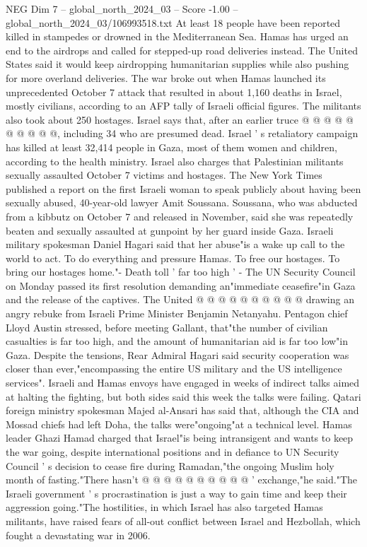 \begin{textsample}{NEG Dim 7 – global\_north\_2024\_03 – Score -1.00 – global\_north\_2024\_03/106993518.txt}
At least 18 people have been reported killed in stampedes or drowned in the Mediterranean Sea.
Hamas has urged an end to the airdrops and called for stepped-up road deliveries instead.
The United States said it would keep airdropping humanitarian supplies while also pushing for more overland deliveries.
The war broke out when Hamas launched its unprecedented October 7 attack that resulted in about 1,160 deaths in Israel, mostly civilians, according to an AFP tally of Israeli official figures.
The militants also took about 250 hostages.
Israel says that, after an earlier truce @ @ @ @ @ @ @ @ @ @, including 34 who are presumed dead.
Israel ' s retaliatory campaign has killed at least 32,414 people in Gaza, most of them women and children, according to the health ministry.
Israel also charges that Palestinian militants sexually assaulted October 7 victims and hostages.
The New York Times published a report on the first Israeli woman to speak publicly about having been sexually abused, 40-year-old lawyer Amit Soussana.
Soussana, who was abducted from a kibbutz on October 7 and released in November, said she was repeatedly beaten and sexually assaulted at gunpoint by her guard inside Gaza.
Israeli military spokesman Daniel Hagari said that her abuse"is a wake up call to the world to act.
To do everything and pressure Hamas.
To free our hostages.
To bring our hostages home."- Death toll ' far too high ' - The UN Security Council on Monday passed its first resolution demanding an"immediate ceasefire"in Gaza and the release of the captives.
The United @ @ @ @ @ @ @ @ @ @ drawing an angry rebuke from Israeli Prime Minister Benjamin Netanyahu.
Pentagon chief Lloyd Austin stressed, before meeting Gallant, that"the number of civilian casualties is far too high, and the amount of humanitarian aid is far too low"in Gaza.
Despite the tensions, Rear Admiral Hagari said security cooperation was closer than ever,"encompassing the entire US military and the US intelligence services".
Israeli and Hamas envoys have engaged in weeks of indirect talks aimed at halting the fighting, but both sides said this week the talks were failing.
Qatari foreign ministry spokesman Majed al-Ansari has said that, although the CIA and Mossad chiefs had left Doha, the talks were"ongoing"at a technical level.
Hamas leader Ghazi Hamad charged that Israel"is being intransigent and wants to keep the war going, despite international positions and in defiance to UN Security Council ' s decision to cease fire during Ramadan,"the ongoing Muslim holy month of fasting."There hasn't @ @ @ @ @ @ @ @ @ @ ' exchange,"he said."The Israeli government ' s procrastination is just a way to gain time and keep their aggression going."The hostilities, in which Israel has also targeted Hamas militants, have raised fears of all-out conflict between Israel and Hezbollah, which fought a devastating war in 2006.

\end{textsample}
